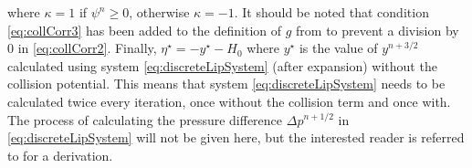 %
where $\kappa = 1$ if $\psi^n \geq 0$, otherwise $\kappa = -1$. It should be noted that condition \eqref{eq:collCorr3} has been added to the definition of $g$ from \cite{Ducceschi2021} to prevent a division by 0 in \eqref{eq:collCorr2}. Finally, $\eta^\star = -y^{\star} - H_0$ where $y^{\star}$ is the value of $y^{n+3/2}$ calculated using system \eqref{eq:discreteLipSystem} (after expansion) without the collision potential. This means that system \eqref{eq:discreteLipSystem} needs to be calculated twice every iteration, once without the collision term and once with. The process of calculating the pressure difference $\Delta p^{n+1/2}$ in \eqref{eq:discreteLipSystem} will not be given here, but the interested reader is referred to \cite[Ch. 5]{Harrison2018} for a derivation.


